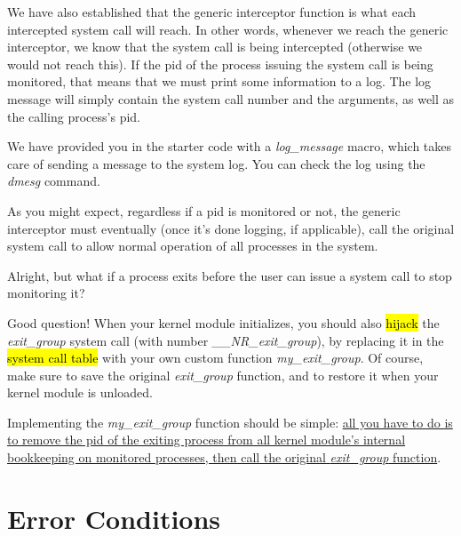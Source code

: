 \documentclass[12pt]{article}
\begin{document}
\begin{itemize}
\begin{enumerate}[1.]
    \bigskip

    We have also established that the generic interceptor function is what each
    intercepted system call will reach. In other words, whenever we reach the
    generic interceptor, we know that the system call is being intercepted
    (otherwise we would not reach this). If the pid of the process issuing the system
    call is being monitored, that means that we must print some information to a log.
    The log message will simply contain the system call number and the arguments,
    as well as the calling process's pid.

    \bigskip

    We have provided you in the starter code with a \textit{log\_message} macro,
    which takes care of sending a message to the system log. You can check the
    log using the \textit{dmesg} command.

    \bigskip

    As you might expect, regardless if a pid is monitored or not, the generic
    interceptor must eventually (once it's done logging, if applicable), call the
    original system call to allow normal operation of all processes in the system.

    \bigskip

    Alright, but what if a process exits before the user can issue a system call to stop monitoring it?

    \bigskip

    Good question! When your kernel module initializes, you should also \hl{hijack} the
    \textit{exit\_group} system call (with number \textit{\_\_NR\_exit\_group}), by
    replacing it in the \hl{system call table} with your own custom function
    \textit{my\_exit\_group}. Of course, make sure to save the original
    \textit{exit\_group} function, and to restore it when your kernel module is unloaded.

    \bigskip

    Implementing the \textit{my\_exit\_group} function should be simple: \ul{all you
    have to do is to remove the pid of the exiting process from all kernel module's
    internal bookkeeping on monitored processes, then call the original \textit{exit\_group} function}.
    \end{enumerate}
\end{itemize}

\section{Error Conditions}
\end{document}
